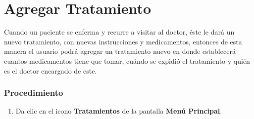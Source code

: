 \section{Agregar Tratamiento}

Cuando un paciente se enferma y recurre a visitar al doctor, éste le dará un nuevo tratamiento, con nuevas instrucciones y medicamentos, entonces de esta manera el usuario podrá agregar un tratamiento nuevo en donde establecerá cuantos medicamentos tiene que tomar, cuándo se expidió el tratamiento y quién es el doctor encargado de este.

\subsubsection{Procedimiento}
\begin{enumerate}
	
	\item Da clic en el icono \textbf{Tratamientos} de la pantalla \textbf{Menú Principal}.


\end{enumerate}

